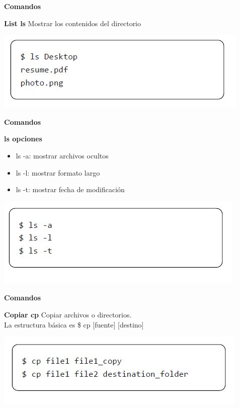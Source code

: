 \documentclass{beamer}
\begin{document}
\begin{frame}
	
	\textbf{Comandos}
	\begin{block}{\textbf{List ls}}
		Mostrar los contenidos del directorio
	\end{block}	
	\begin{center}
		\includegraphics[scale=.6]{img/bash/ls.JPG}
	\end{center}
	
\end{frame}

\begin{frame}
	
	\textbf{Comandos}
	\begin{block}{\textbf{ls opciones}}
				\begin{itemize}
			\item ls -a: mostrar archivos ocultos
			\item ls -l: mostrar formato largo
			\item ls -t: mostrar fecha de modificación
		\end{itemize}
	\end{block}	
	\begin{center}
		\includegraphics[scale=.6]{img/bash/ls2.JPG}
	\end{center}
	
\end{frame}

\begin{frame}
	
	\textbf{Comandos}
	\begin{block}{\textbf{Copiar cp}}
		Copiar archivos o directorios. \\ 
		La estructura básica es \$ cp [fuente] [destino]
	\end{block}	
	\begin{center}
		\includegraphics[scale=.6]{img/bash/cp.JPG}
	\end{center}
	
\end{frame}
\end{document}
